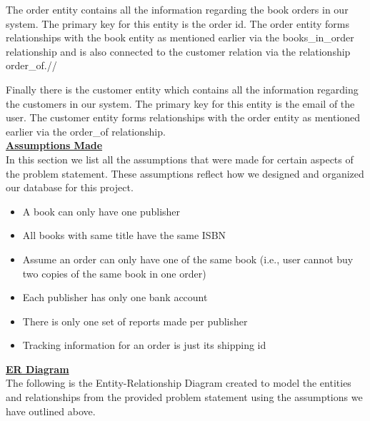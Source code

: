 \documentclass[a4 paper]{article}
\begin{document}
\noindent The order entity contains all the information regarding the book orders in our system. The primary key for this entity is the order id. The order entity forms relationships with the book entity as mentioned earlier via the books\_in\_order relationship and is also connected to the customer relation via the relationship order\_of.//

\noindent Finally there is the customer entity which contains all the information regarding the customers in our system. The primary key for this entity is the email of the user. The customer entity forms relationships with the order entity as mentioned earlier via the order\_of relationship.\\

\noindent\underline{\textbf{Assumptions Made}}\\
In this section we list all the assumptions that were made for certain aspects of the problem statement. These assumptions reflect how we designed and organized our database for this project.

\begin{itemize}
	\item A book can only have one publisher
	\item All books with same title have the same ISBN
	\item Assume an order can only have one of the same book (i.e., user cannot buy two copies of the same book in one order)
	\item Each publisher has only one bank account
	\item There is only one set of reports made per publisher
	\item Tracking information for an order is just its shipping id
\end{itemize}

\noindent\underline{\textbf{ER Diagram}}\\
The following is the Entity-Relationship Diagram created to model the entities and relationships from the provided problem statement using the assumptions we have outlined above.\\
\end{document}
